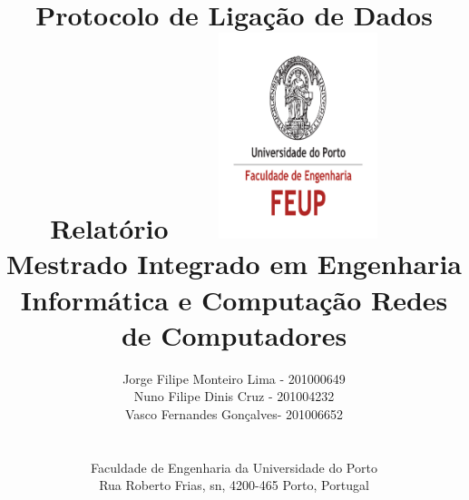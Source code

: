\documentclass[a4paper,11pt]{article}
\begin{document}
\lstset{breaklines=true,
basicstyle=\ttfamily\small}
\setlength{\textheight}{22cm}

\title{\Huge\textbf{Protocolo de Ligação de Dados}\linebreak\linebreak\linebreak
\Large\textbf{Relatório}\linebreak\linebreak
\includegraphics[height=6cm, width=7cm]{feup.pdf}\linebreak \linebreak
\Large{Mestrado Integrado em Engenharia Informática e Computação} \linebreak \linebreak
\Large{Redes de Computadores}\linebreak
}

\author{
Jorge Filipe Monteiro Lima - 201000649
\\ Nuno Filipe Dinis Cruz - 201004232 
\\ Vasco Fernandes Gonçalves- 201006652 \\\linebreak\linebreak \\
 \\ Faculdade de Engenharia da Universidade do Porto \\ Rua Roberto Frias, s\/n, 4200-465 Porto, Portugal \linebreak\linebreak\linebreak
\linebreak\linebreak\vspace{1cm}}
\maketitle
\thispagestyle{empty}
\end{document}
